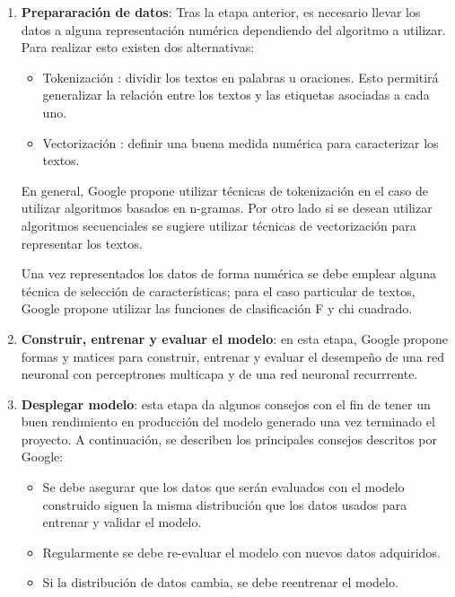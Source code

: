 \begin{enumerate}
    \item \textbf{Prepararación de datos}: Tras la etapa anterior, es necesario llevar los datos a alguna representación numérica dependiendo del algoritmo a utilizar. Para realizar esto existen dos alternativas:
    \begin{itemize}
        \item Tokenización : dividir los textos en palabras u oraciones. Esto permitirá generalizar la relación entre los textos y las etiquetas asociadas a cada uno. 
        \item Vectorización : definir una buena medida numérica para caracterizar los textos.
    \end{itemize}
        En general, Google propone utilizar técnicas de tokenización en el caso de utilizar algoritmos basados en n-gramas. Por otro lado si se desean utilizar algoritmos secuenciales se sugiere utilizar técnicas de vectorización para representar los textos. 
        
        Una vez representados los datos de forma numérica se debe emplear alguna técnica de selección de características; para el caso particular de textos, Google propone utilizar las funciones de clasificación F y chi cuadrado.
    \item \textbf{Construir, entrenar y evaluar el modelo}: en esta etapa, Google propone formas y matices para construir, entrenar y evaluar el desempeño de una red neuronal con perceptrones multicapa y de una red neuronal recurrrente. 
    \item \textbf{Desplegar modelo}: esta etapa da algunos consejos con el fin de tener un buen rendimiento en producción del modelo generado una vez terminado el proyecto. A continuación, se describen los principales consejos descritos por Google:
    \begin{itemize}
        \item Se debe asegurar que los datos que serán evaluados con el modelo construido siguen la misma distribución que los datos usados para entrenar y validar el modelo.
        \item Regularmente se debe re-evaluar el modelo con nuevos datos adquiridos.
        \item Si la distribución de datos cambia, se debe reentrenar el modelo.
    \end{itemize}
    \end{enumerate}
    
